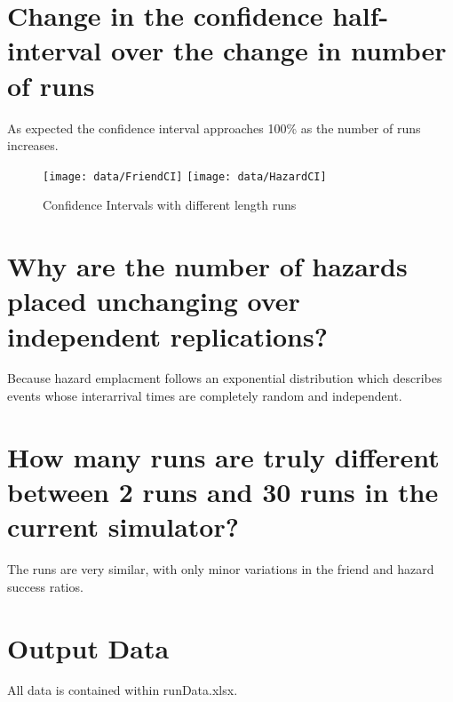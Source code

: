 \documentclass[12pt,letterpaper,titlepage]{article}
\begin{document}
\section{Change in the confidence half-interval over the change in number of runs}

As expected the confidence interval approaches 100\% as the number of
runs increases.

\begin{figure}\centering
  \texttt{[image: data/FriendCI]}
  \texttt{[image: data/HazardCI]}
  \caption{Confidence Intervals with different length runs}
\end{figure}

\section{Why are the number of hazards placed unchanging over independent replications?}

Because hazard emplacment follows an exponential distribution which describes events whose interarrival times are completely random and independent.

\section{How many runs are truly different between 2 runs and 30 runs in the current simulator?}

The runs are very similar, with only minor variations in the friend
and hazard success ratios.

\section{Output Data}

All data is contained within runData.xlsx.
\end{document}

